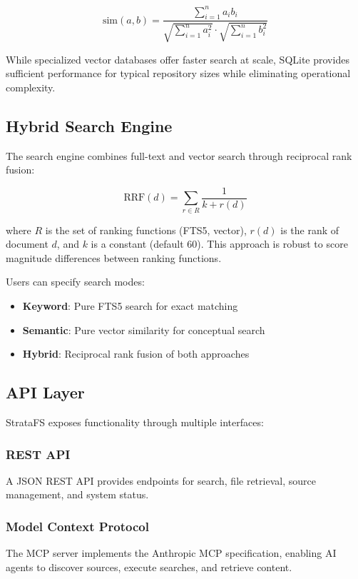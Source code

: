 \documentclass[conference]{IEEEtran}
\begin{document}
\begin{equation}
    \text{sim}(a, b) = \frac{\sum_{i=1}^{n} a_i b_i}{\sqrt{\sum_{i=1}^{n} a_i^2} \cdot \sqrt{\sum_{i=1}^{n} b_i^2}}
\end{equation}

While specialized vector databases offer faster search at scale, SQLite provides sufficient performance for typical repository sizes while eliminating operational complexity.

\subsection{Hybrid Search Engine}

The search engine combines full-text and vector search through reciprocal rank fusion:

\begin{equation}
    \text{RRF}(d) = \sum_{r \in R} \frac{1}{k + r(d)}
\end{equation}

where $R$ is the set of ranking functions (FTS5, vector), $r(d)$ is the rank of document $d$, and $k$ is a constant (default 60). This approach is robust to score magnitude differences between ranking functions.

Users can specify search modes:

\begin{itemize}
    \item \textbf{Keyword}: Pure FTS5 search for exact matching
    \item \textbf{Semantic}: Pure vector similarity for conceptual search
    \item \textbf{Hybrid}: Reciprocal rank fusion of both approaches
\end{itemize}

\subsection{API Layer}

StrataFS exposes functionality through multiple interfaces:

\subsubsection{REST API}
A JSON REST API provides endpoints for search, file retrieval, source management, and system status.

\subsubsection{Model Context Protocol}
The MCP server implements the Anthropic MCP specification, enabling AI agents to discover sources, execute searches, and retrieve content.
\end{document}
